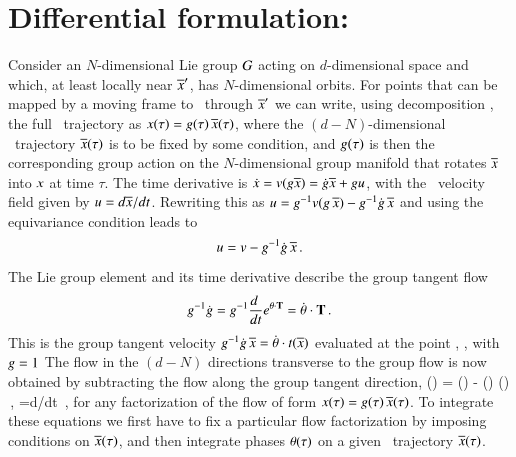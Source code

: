 \documentclass[preprint,number,sort&compress]{elsarticle}
\begin{document}
\section{\label{sec:MovFrameODE}Differential formulation: \Mslices}


Consider an $N$-dimensional Lie group $G$ acting on
$d$-dimensional space and which, at least locally near
${\overline{x}'}$, has $N$-dimensional orbits. For points that can be
mapped by a moving frame to \slice\ through ${\overline{x}'}$ we can
write, using decomposition , the full
\statesp\ trajectory as $x(\tau)=
g(\tau)\,\overline{x}(\tau)$, where the
$(d\!-\!N)$-dim\-ens\-ion\-al \reducedsp\ trajectory
$\overline{x}(\tau)$ is to be fixed by some condition, and
$g(\tau)$ is then the corresponding group action on the
$N$-dim\-ens\-ion\-al group manifold that
rotates $\overline{x}$ into $x$ at time $\tau$. The time
derivative is $\dot{x}= v(g\overline{x}) =
\dot{g}\overline{x} + gu$, with the \reducedsp\
velocity field given by $u={d\overline{x}}/{dt}$. Rewriting
this as $ u = g^{-1} v(g \, \overline{x}) -
g^{-1} \dot{g} \, \overline{x} $ and using the
equivariance condition  leads to
\[
u = v - g^{-1} \dot{g} \, \overline{x}
\,.
\]
The Lie group element  and its time
derivative describe the group tangent flow
\[
g^{-1} \dot{g} =
g^{-1}\frac{d~}{dt} e^{{\bf \theta} \cdot \mathbf{T} } =
\dot{{\bf \theta}} \cdot \mathbf{T}
\,.
\]
This is the group tangent velocity $g^{-1} \dot{g}
\, \overline{x} = \dot{{\bf \theta}} \cdot t(\overline{x})$
evaluated at the point \sspRed, \ie, with ${g} = 1$
 The flow in the $(d\!-\!N)$
directions transverse to the group flow is now obtained by
subtracting the flow along the group tangent direction,
\beq
\velRed(\sspRed) = \vel(\sspRed)
      - \dot{\gSpace}(\sspRed) \cdot \groupTan(\sspRed)
\,,\qquad
\velRed={d\sspRed}/{dt}
\,,
for any factorization of the flow of form $x(\tau)=
g(\tau)\, \overline{x}(\tau)$. To integrate these equations
we first have to fix a particular flow factorization by
imposing conditions on $\overline{x}(\tau)$, and then integrate
phases ${\bf \theta}(\tau)$ on a given \reducedsp\ trajectory
$\overline{x}(\tau)$.
\end{document}
